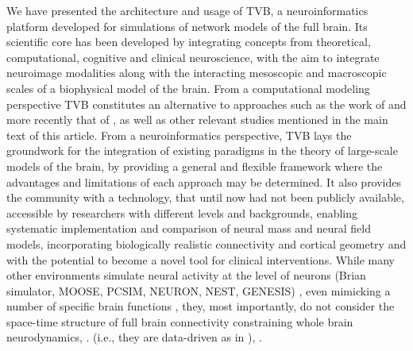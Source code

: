 \documentclass{bioinfo}
\begin{document}
    We have presented the architecture and usage of TVB, a neuroinformatics
    platform developed for simulations of network models of the full brain. Its
    scientific core has been  developed by integrating concepts from theoretical,
    computational, cognitive and clinical neuroscience, with the aim to integrate
    neuroimage modalities along with the interacting mesoscopic and macroscopic
    scales of a biophysical model of the brain. From a computational modeling
    perspective  TVB constitutes an alternative to approaches such as the work of
    \citet{Riera_2005} and  more recently that of \citet{Valdes-Sosa_2009}, as well
    as other relevant studies mentioned in the main text of this article. From a
    neuroinformatics perspective, TVB lays the groundwork for the integration of
    existing paradigms in the theory of large-scale models of the brain, by
    providing a general and flexible framework where the advantages and limitations
    of each approach may be determined. It also provides the community with a
    technology, that until now had not been publicly available, accessible by
    researchers with different levels and backgrounds, enabling systematic
    implementation and comparison of neural mass and neural field  models,
    incorporating biologically realistic connectivity and cortical geometry and with
    the potential to become a novel tool for clinical interventions. While many
    other environments simulate     neural activity at the level of neurons (Brian
    simulator, MOOSE, PCSIM,     NEURON, NEST, GENESIS) \citep{Goodman_2008,
    Brette_2011,Ray_2008,Hines_2001,Gewaltig_2007scholarpedia,Pecevski_2009},  even mimicking a
    number of specific brain functions \citep{Eliasmith_2012}, they, most
    importantly, do not consider the space-time structure of full brain connectivity
    constraining whole brain neurodynamics, .  
    \citep{Friston_1995, Friston_2003, David_2006, Pinotsis_2011} (i.e., they are
    data-driven as in \citet{Freestone_2011}),   \citet{Bojak_2011}. 
    
\end{document}
